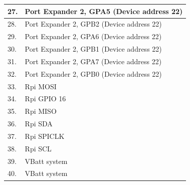 \documentclass[a4paper,12pt,oneside]{book}
\begin{document}
\begin{tabular}{|p{2cm}|p{10cm}|}
\hline
 27. &Port Expander 2, GPA5 (Device address 22)\\
\hline
 28. &Port Expander 2, GPB2 (Device address 22)\\
\hline
 29. &Port Expander 2, GPA6 (Device address 22)\\
\hline
 30. &Port Expander 2, GPB1 (Device address 22)\\
\hline
 31. &Port Expander 2, GPA7 (Device address 22)\\
\hline
 32. &Port Expander 2, GPB0 (Device address 22)\\
\hline
33. & Rpi MOSI\\
\hline
34. & Rpi GPIO 16\\
\hline
35. & Rpi MISO\\
\hline  
36. & Rpi SDA\\
\hline	
37. & Rpi SPICLK\\
\hline
38. & Rpi SCL\\
\hline
39. & VBatt system\\
\hline
40. &  VBatt system\\
\hline
	
\end{tabular}
\pagebreak 
\end{document}
